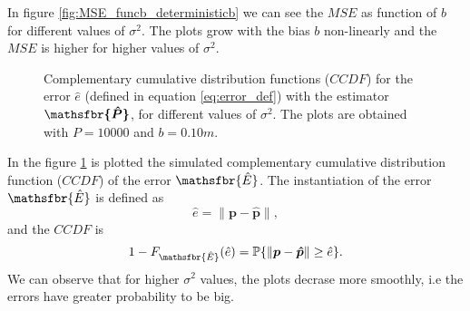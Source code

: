 \documentclass[%
    twoside, 
    a4paper
    ]{article}
\DeclareRobustCommand{\msf}[1]{%
  \ifcat\noexpand#1\relax\msfgreek{#1}\else\mathsfbr{#1}\fi%
}
\begin{document}
    In figure \ref{fig:MSE_funcb_deterministicb} we can see the $MSE$ as function of $b$ for 
    different values of $\sigma^2$. The plots grow with the bias $b$ non-linearly 
    and the $MSE$ is higher for higher values of $\sigma^2$.
    \begin{figure}[t]
        \centering
        
        \caption{Complementary cumulative distribution functions ($CCDF$) for the error $\hat{e}$ 
        (defined in equation \ref{eq:error_def}) with the estimator $\bm{\msf{\hat{P}}}$, for 
        different values of $\sigma^2$. The plots are 
        obtained with $P=10000$ and $b=0.10 \si{m}$.}
        \label{fig:CCDF_unknownb}
    \end{figure}

    In the figure \ref{fig:CCDF_unknownb} is plotted the simulated complementary cumulative 
    distribution function ($CCDF$) of the error $\msf{\hat{E}}$.
    The instantiation of the error $\msf{\hat{E}}$ is defined as
    \begin{equation}
        \hat{e} = \lVert \bm{p} - \bm{\hat{p}} \rVert,
        \label{eq:error_def}
    \end{equation}
    and the $CCDF$ is
    \begin{equation}
        1-F_{\msf{\hat{E}}}(\hat{e}) = \mathbb{P}\{ \lVert \bm{p} - \bm{\hat{p}} \rVert \geq  \hat{e}\}.
    \end{equation}
    We can observe that for higher $\sigma^2$ values, the plots decrase more smoothly, i.e the 
    errors have greater probability to be big.
\end{document}
